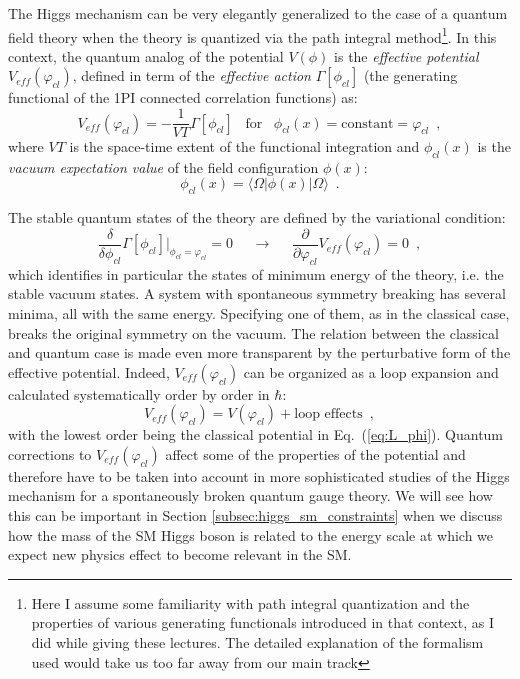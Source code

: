\documentclass[12pt,prd,onecolumn,aps,floats,superscriptaddress,floatfix,nofootinbib]{revtex4-2}
\begin{document}
The Higgs mechanism can be very elegantly generalized to the case of a
quantum field theory when the theory is quantized via the path
integral method\footnote{Here I assume some familiarity with path
integral quantization and the properties of various generating
functionals introduced in that context, as I did while giving these
lectures. The detailed explanation of the formalism used would take us
too far away from our main track}. In this context, the quantum analog
of the potential $V(\phi)$ is the
\emph{effective potential} $V_{eff}(\varphi_{cl})$, defined in term of
the \emph{effective action} $\Gamma[\phi_{cl}]$ (the generating
functional of the 1PI connected correlation functions) as:
\begin{equation}
\label{eq:v_eff}
V_{eff}(\varphi_{cl})=-\frac{1}{VT}\Gamma[\phi_{cl}]\,\,\,\,\,\mbox{for}
\,\,\,\,\,\phi_{cl}(x)=\mbox{constant}=\varphi_{cl}\,\,\,,
\end{equation}
where $VT$ is the space-time extent of the functional integration and
$\phi_{cl}(x)$ is the \emph{vacuum expectation value} of the field
configuration $\phi(x)$:
\begin{equation}
\label{eq:phi_cl}
\phi_{cl}(x)=\langle\Omega| \phi(x)|\Omega\rangle\,\,\,.
\end{equation}

The stable quantum states of the theory are defined by the variational
condition:
\begin{equation}
\label{eq:delta_v_eff}
\frac{\delta}{\delta\phi_{cl}}\Gamma[\phi_{cl}]\bigg|_{\phi_{cl}=\varphi_{cl}}=0
\,\,\,\,\,\,\,\,\longrightarrow\,\,\,\,\,\,\,\,
\frac{\partial}{\partial\varphi_{cl}}V_{eff}(\varphi_{cl})=0\,\,\,,
\end{equation}
which identifies in particular the states of minimum energy of the
theory, i.e. the stable vacuum states. A system with spontaneous
symmetry breaking has several minima, all with the same
energy. Specifying one of them, as in the classical case, breaks
the original symmetry on the vacuum. The relation between the
classical and quantum case is made even more transparent by the
perturbative form of the effective potential. Indeed,
$V_{eff}(\varphi_{cl})$ can be organized as a loop expansion and
calculated systematically order by order in $\hbar$:
\begin{equation}
\label{eq:veff_exp}
V_{eff}(\varphi_{cl})=V(\varphi_{cl})+\mbox{loop effects}\,\,\,,
\end{equation}
with the lowest order being the classical potential in
Eq.~(\ref{eq:L_phi}). Quantum corrections to $V_{eff}(\varphi_{cl})$
affect some of the properties of the potential and therefore
have to be taken into account in more sophisticated studies of the
Higgs mechanism for a spontaneously broken quantum gauge theory.  We
will see how this can be important in Section 
\ref{subsec:higgs_sm_constraints} when
we discuss how the mass of the SM Higgs boson is related to the
energy scale at which we expect new physics effect to become relevant
in the SM.
\end{document}
